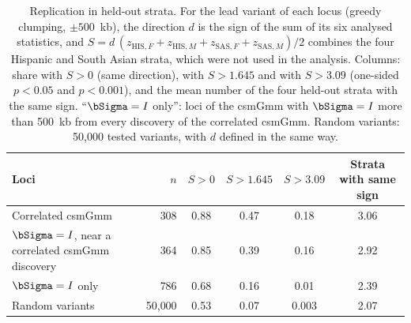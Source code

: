 \begin{table}[!htbp]
\centering
\caption{Replication in held-out strata. For the lead variant of each locus (greedy clumping, $\pm500$~kb), the direction $d$ is the sign of the sum of its six analysed statistics, and $S=d\,(z_{\mathrm{HIS},F}+z_{\mathrm{HIS},M}+z_{\mathrm{SAS},F}+z_{\mathrm{SAS},M})/2$ combines the four Hispanic and South Asian strata, which were not used in the analysis. Columns: share with $S>0$ (same direction), with $S>1.645$ and with $S>3.09$ (one-sided $p<0.05$ and $p<0.001$), and the mean number of the four held-out strata with the same sign. ``$\bSigma=I$ only'': loci of the csmGmm with $\bSigma=I$ more than 500~kb from every discovery of the correlated csmGmm. Random variants: 50{,}000 tested variants, with $d$ defined in the same way.}\label{tab:realdata-holdout}
\small
\begin{tabular}{lr cccc}
\toprule
Loci & $n$ & $S>0$ & $S>1.645$ & $S>3.09$ & Strata with same sign\\
\midrule
Correlated csmGmm & 308 & 0.88 & 0.47 & 0.18 & 3.06\\
$\bSigma=I$, near a correlated csmGmm discovery & 364 & 0.85 & 0.39 & 0.16 & 2.92\\
$\bSigma=I$ only & 786 & 0.68 & 0.16 & 0.01 & 2.39\\
Random variants & 50{,}000 & 0.53 & 0.07 & 0.003 & 2.07\\
\bottomrule
\end{tabular}
\end{table}
